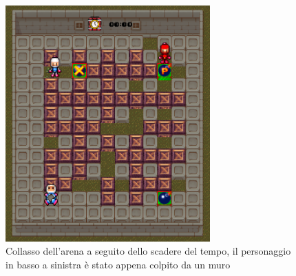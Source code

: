 \documentclass[a4paper,12pt]{report}
\begin{document}
\begin{figure}[h]
    \centering{}
    \includegraphics[width=0.7\textwidth]{img/map-collapse.PNG}
    \caption{Collasso dell'arena a seguito dello scadere del tempo, il personaggio in basso a sinistra è stato appena colpito da un muro}
\end{figure}
\end{document}

